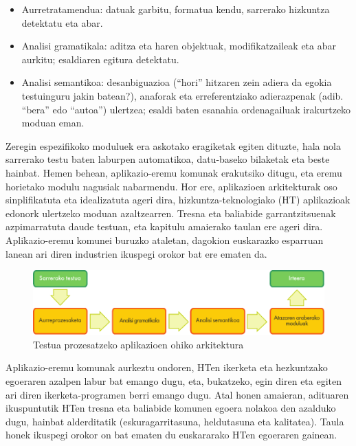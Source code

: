 \begin{multicols}{2}
    \begin{itemize}
      \item Aurretratamendua: datuak garbitu, formatua kendu, sarrerako hizkuntza detektatu eta abar. 
      \item Analisi gramatikala: aditza eta haren objektuak, modifikatzaileak eta abar aurkitu; esaldiaren egitura detektatu.
      \item Analisi semantikoa: desanbiguazioa (“hori” hitzaren zein adiera da egokia testuinguru jakin batean?), anaforak eta erreferentziako adierazpenak (adib. “bera” edo “autoa”) ulertzea; esaldi baten esanahia ordenagailuak irakurtzeko moduan eman.
    \end{itemize}
    Zeregin espezifikoko moduluek era askotako eragiketak egiten dituzte, hala nola sarrerako testu baten laburpen automatikoa, datu-baseko bilaketak eta beste hainbat. Hemen behean, aplikazio-eremu komunak erakutsiko ditugu, eta eremu horietako modulu nagusiak nabarmendu. Hor ere, aplikazioen arkitekturak oso sinplifikatuta eta idealizatuta ageri dira, hizkuntza-teknologiako (HT) aplikazioak edonork ulertzeko moduan azaltzearren. Tresna eta baliabide garrantzitsuenak azpimarratuta daude testuan, eta kapitulu amaierako taulan ere ageri dira. Aplikazio-eremu komunei buruzko ataletan, dagokion euskarazko esparruan lanean ari diren industrien ikuspegi orokor bat ere ematen da.
    
\begin{figure}[b]
  \center
 \includegraphics[width=\textwidth]{../_media/basque/text_processing_app_architecture}
  \caption{Testua prozesatzeko aplikazioen ohiko arkitektura}
  \label{fig:textprocessingarch_eu}
\end{figure}

Aplikazio-eremu komunak aurkeztu ondoren, HTen ikerketa eta hezkuntzako egoeraren azalpen labur bat emango dugu, eta, bukatzeko, egin diren eta egiten ari diren ikerketa-programen berri emango dugu. Atal honen amaieran, adituaren ikuspuntutik HTen tresna eta baliabide komunen egoera nolakoa den azalduko dugu, hainbat alderditatik (eskuragarritasuna, heldutasuna eta kalitatea). Taula honek ikuspegi orokor on bat ematen du euskararako HTen egoeraren gainean.  


\end{multicols}
